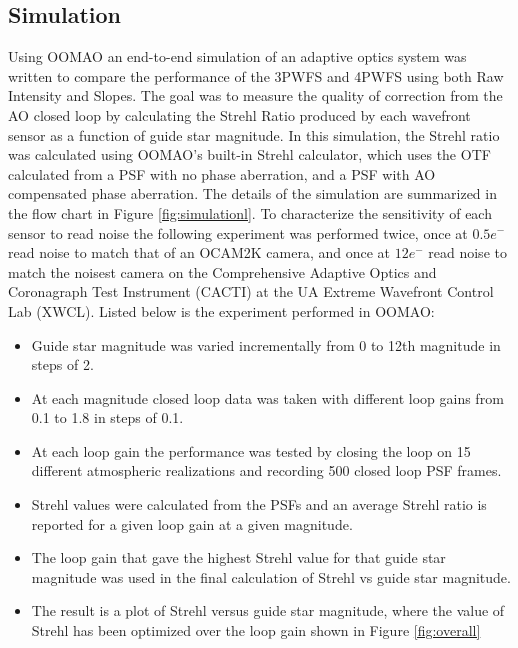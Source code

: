 \subsection{Simulation}

Using OOMAO an end-to-end simulation of an adaptive optics system was written to compare the performance of the 3PWFS and 4PWFS using both Raw Intensity and Slopes.  The goal was to measure the quality of correction from the AO closed loop by calculating the Strehl Ratio produced by each wavefront sensor as a function of guide star magnitude. In this simulation, the Strehl ratio was calculated using OOMAO's built-in Strehl calculator, which uses the OTF calculated from a PSF with no phase aberration, and a PSF with AO compensated phase aberration. The details of the simulation are summarized in the flow chart in Figure \ref{fig:simulationl}. To characterize the sensitivity of each sensor to read noise the following experiment was performed twice, once at $0.5e^-$ read noise to match that of an OCAM2K camera, and once at $12 e^-$ read noise to match the noisest camera on the Comprehensive Adaptive Optics and Coronagraph Test Instrument (CACTI) at the UA Extreme Wavefront Control Lab (XWCL). Listed below is the experiment performed in OOMAO:

\begin{itemize}
    \item Guide star magnitude was varied incrementally from 0 to 12th magnitude in steps of 2.
    \item At each magnitude closed loop data was taken with different loop gains from 0.1 to 1.8 in steps of 0.1.
    \item At each loop gain the performance was tested by closing the loop on 15 different atmospheric realizations and recording 500 closed loop PSF frames. 
    \item Strehl values were calculated from the PSFs and an average Strehl ratio is reported for a given loop gain at a given magnitude.
    \item The loop gain that gave the highest Strehl value for that guide star magnitude was used in the final calculation of Strehl vs guide star magnitude.
    \item The result is a plot of Strehl versus guide star magnitude, where the value of Strehl has been optimized over the loop gain shown in Figure \ref{fig:overall}
\end{itemize}


